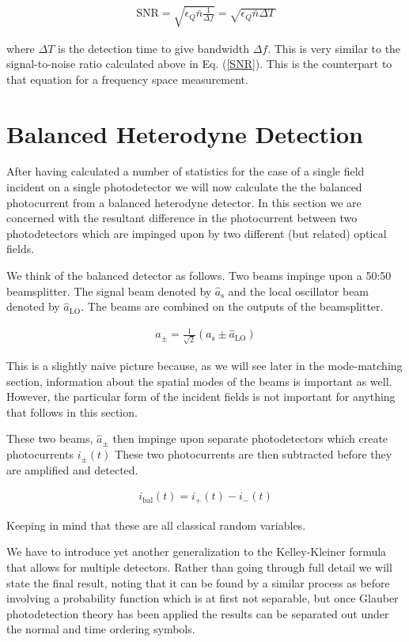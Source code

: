 \documentclass[12pt]{article}
\begin{document}
\begin{align}
\text{SNR} = \sqrt{\epsilon_Q \bar{n} \frac{1}{\Delta f}} = \sqrt{\epsilon_Q \bar{n} \Delta T}
\end{align}

where $\Delta T$ is the detection time to give bandwidth $\Delta f$. This is very similar to the signal-to-noise ratio calculated above in Eq. (\ref{SNR}). This is the counterpart to that equation for a frequency space measurement.

\section{Balanced Heterodyne Detection}

After having calculated a number of statistics for the case of a single field incident on a single photodetector we will now calculate the the balanced photocurrent from a balanced heterodyne detector. In this section we are concerned with the resultant difference in the photocurrent between two photodetectors which are impinged upon by two different (but related) optical fields.

We think of the balanced detector as follows. Two beams impinge upon a 50:50 beamsplitter. The signal beam denoted by $\hat{a}_{\text{s}}$ and the local oscillator beam denoted by $\hat{a}_{\text{LO}}$. The beams are combined on the outputs of the beamsplitter.

\begin{align}
\label{balphoton}
a_{\pm} = \frac{1}{\sqrt{2}}\left(\hat{a}_{\text{s}} \pm \hat{a}_{\text{LO}}\right)
\end{align}

This is a slightly naive picture because, as we will see later in the mode-matching section, information about the spatial modes of the beams is important as well. However, the particular form of the incident fields is not important for anything that follows in this section.

These two beams, $\hat{a}_{\pm}$ then impinge upon separate photodetectors which create photocurrents $i_{\pm}(t)$ These two photocurrents are then subtracted before they are amplified and detected.

\begin{align}
i_{\text{bal}}(t) = i_+(t) - i_-(t)
\end{align}

Keeping in mind that these are all classical random variables. 

We have to introduce yet another generalization to the Kelley-Kleiner formula that allows for multiple detectors. Rather than going through full detail we will state the final result, noting that it can be found by a similar process as before involving a probability function which is at first not separable, but once Glauber photodetection theory has been applied the results can be separated out under the normal and time ordering symbols.
\end{document}
